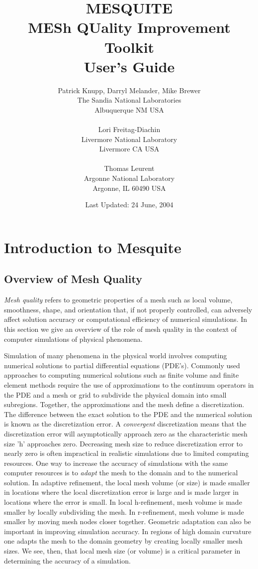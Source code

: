\documentclass[letter]{report}
\title{ {\LARGE\bf 
        MESQUITE \\ MESh QUality Improvement Toolkit \\ \vspace{.5cm} User's Guide\\
}}
\author{Patrick Knupp, Darryl Melander, Mike Brewer \\
The Sandia National Laboratories \\
Albuquerque NM USA \\
 \\
Lori Freitag-Diachin \\
Livermore National Laboratory \\
Livermore CA USA \\
  \\
Thomas Leurent \\
Argonne National Laboratory \\
Argonne, IL 60490 USA}
\date{Last Updated: 24 June, 2004}
\begin{document}
\maketitle

\tableofcontents

\listoffigures

\listoftables

\chapter{Introduction to Mesquite} \label{sec:intro}

\section{Overview of Mesh Quality}

\hskip 0.25in {\it Mesh quality} refers to geometric properties of a mesh such as 
local volume, smoothness, shape, and orientation that, if not properly 
controlled, 
can adversely affect solution accuracy or computational efficiency of numerical simulations. In this section we give an overview of the role of mesh quality 
in the context of computer simulations of physical phenomena. \newline

Simulation of many phenomena in the physical world involves computing 
numerical 
solutions to partial differential equations (PDE's). Commonly used approaches 
to computing  numerical solutions such as finite volume and finite 
element methods require the use of approximations to the continuum operators 
in the PDE and a mesh or grid to subdivide the physical domain into small 
subregions. Together, the approximations and the mesh define a discretization. 
The difference between the exact solution to the PDE and the numerical solution is known as the discretization error. A {\it convergent} 
discretization means that the discretization error will asymptotically 
approach zero as the characteristic mesh size 'h' 
approaches zero. Decreasing mesh size to reduce discretization error to 
nearly zero is often impractical in realistic simulations due to limited 
computing resources. One way to increase the accuracy of simulations with the 
same computer resources is to {\it adapt} the mesh to the domain and to the 
numerical solution. In adaptive refinement, the local mesh volume (or size) 
is made smaller in locations where the local discretization error is large and 
is made larger in locations where the error is small. In local h-refinement, 
mesh volume is made smaller by locally subdividing the mesh. In 
r-refinement, mesh volume is made smaller by moving mesh nodes closer together.
Geometric adaptation can also be important in improving simulation accuracy. In regions of high domain curvature one adapts the mesh to the domain geometry by creating locally smaller mesh sizes. We see, then, that local mesh size (or volume) is a critical parameter in determining the accuracy of a simulation. \newline
\end{document}

